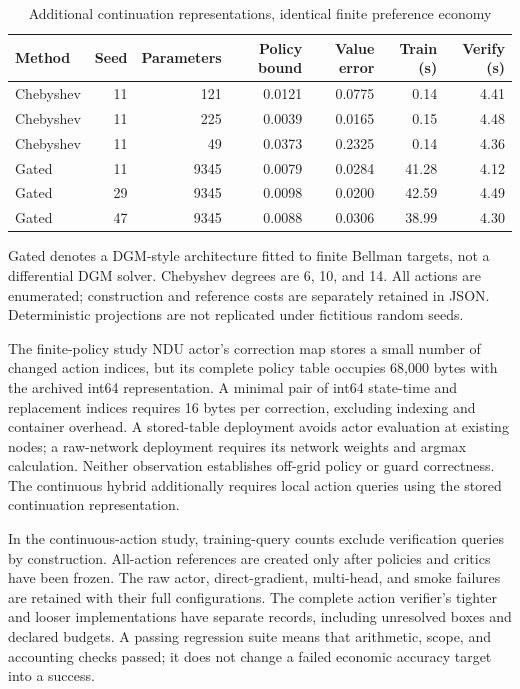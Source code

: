 \documentclass[ecta,nameyear,draft]{econsocart}
\theoremstyle{definition}
\theoremstyle{remark}
\begin{document}
\begin{table}[htbp]\centering
\caption{Additional continuation representations, identical finite preference economy}
\begin{small}\begin{tabular}{lrrrrrr}
\toprule
Method & Seed & Parameters & Policy bound & Value error & Train (s) & Verify (s) \\
\midrule
Chebyshev & 11 & 121 & 0.0121 & 0.0775 & 0.14 & 4.41 \\
Chebyshev & 11 & 225 & 0.0039 & 0.0165 & 0.15 & 4.48 \\
Chebyshev & 11 & 49 & 0.0373 & 0.2325 & 0.14 & 4.36 \\
Gated & 11 & 9345 & 0.0079 & 0.0284 & 41.28 & 4.12 \\
Gated & 29 & 9345 & 0.0098 & 0.0200 & 42.59 & 4.49 \\
Gated & 47 & 9345 & 0.0088 & 0.0306 & 38.99 & 4.30 \\
\bottomrule\end{tabular}\end{small}
\par\smallskip\begin{minipage}{0.96\linewidth}\footnotesize Gated denotes a DGM-style architecture fitted to finite Bellman targets, not a differential DGM solver. Chebyshev degrees are 6, 10, and 14. All actions are enumerated; construction and reference costs are separately retained in JSON. Deterministic projections are not replicated under fictitious random seeds.\end{minipage}
\end{table}


The finite-policy study NDU actor's correction map stores a small number of changed action indices, but its complete policy table occupies 68,000 bytes with the archived int64 representation. A minimal pair of int64 state-time and replacement indices requires 16 bytes per correction, excluding indexing and container overhead. A stored-table deployment avoids actor evaluation at existing nodes; a raw-network deployment requires its network weights and argmax calculation. Neither observation establishes off-grid policy or guard correctness. The continuous hybrid additionally requires local action queries using the stored continuation representation.

In the continuous-action study, training-query counts exclude verification queries by construction. All-action references are created only after policies and critics have been frozen. The raw actor, direct-gradient, multi-head, and smoke failures are retained with their full configurations. The complete action verifier's tighter and looser implementations have separate records, including unresolved boxes and declared budgets. A passing regression suite means that arithmetic, scope, and accounting checks passed; it does not change a failed economic accuracy target into a success.
\end{document}
